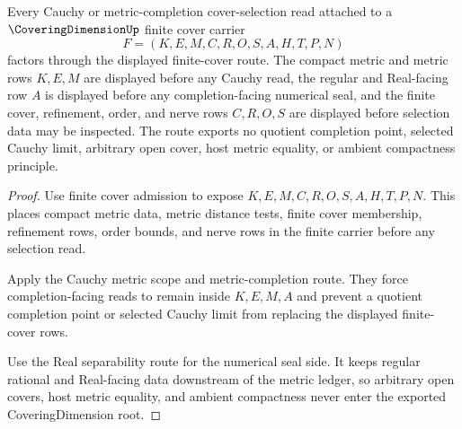 \begin{theorem}
\label{thm:coveringdimension-finite-cover-root-cauchy-selection}
Every Cauchy or metric-completion cover-selection read attached to a $\CoveringDimensionUp$ finite cover carrier
$$
F=(K,E,M,C,R,O,S,A,H,T,P,N)
$$
factors through the displayed finite-cover route. The compact metric and metric rows $K,E,M$ are displayed before any Cauchy read, the regular and Real-facing row $A$ is displayed before any completion-facing numerical seal, and the finite cover, refinement, order, and nerve rows $C,R,O,S$ are displayed before selection data may be inspected. The route exports no quotient completion point, selected Cauchy limit, arbitrary open cover, host metric equality, or ambient compactness principle.
\end{theorem}
\begin{proof}
Use finite cover admission to expose $K,E,M,C,R,O,S,A,H,T,P,N$. This places compact metric data, metric distance tests, finite cover membership, refinement rows, order bounds, and nerve rows in the finite carrier before any selection read.

Apply the Cauchy metric scope and metric-completion route. They force completion-facing reads to remain inside $K,E,M,A$ and prevent a quotient completion point or selected Cauchy limit from replacing the displayed finite-cover rows.

Use the Real separability route for the numerical seal side. It keeps regular rational and Real-facing data downstream of the metric ledger, so arbitrary open covers, host metric equality, and ambient compactness never enter the exported CoveringDimension root.
\end{proof}

